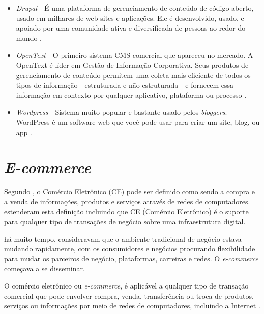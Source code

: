 \documentclass[a4paper,12pt]{monografia}
\begin{document}
\begin{itemize}
\item \textit{Drupal} - É uma plataforma de gerenciamento de conteúdo de código aberto, usado em milhares de web sites e aplicações. Ele é desenvolvido, usado, e apoiado por uma comunidade ativa e diversificada de pessoas ao redor do mundo \cite{drupal}.

\item \textit{OpenText} \citeyear{opentext} - O primeiro sistema CMS comercial que apareceu no mercado. A OpenText é líder em Gestão de Informação Corporativa. Seus produtos de gerenciamento de conteúdo permitem uma coleta mais eficiente de todos os tipos de informação - estruturada e não estruturada - e fornecem essa informação em contexto por qualquer aplicativo, plataforma ou processo \cite{opentext}.

\item \textit{Wordpress} - Sistema muito popular e bastante usado pelos \textit{bloggers}. WordPress é um software web que você pode usar para criar um site, blog, ou app \cite{wordpress}.
\end{itemize}


\section{\textit{E-commerce}} %
\label{sec:e_commerce} 

Segundo , o Comércio Eletrônico (CE) pode ser definido como sendo a compra e a venda de informações, produtos e serviços através de redes de computadores.  estenderam esta definição incluindo que CE (Comércio Eletrônico) é o suporte para qualquer tipo de transações de negócio sobre uma infraestrutura digital.

 há muito tempo, consideravam que o ambiente tradicional de negócio estava mudando rapidamente, com os consumidores e negócios procurando flexibilidade para mudar os parceiros de negócio, plataformas, carreiras e redes. O \textit{e-commerce} começava a se disseminar.

\begin{citacao}
	O comércio eletrônico ou \textit{e-commerce}, é aplicável a qualquer tipo de transação comercial que pode envolver compra, venda, transferência ou troca de produtos, serviços ou informações por meio de redes de computadores, incluindo a Internet \cite{turban}.
\end{citacao}
\end{document}
